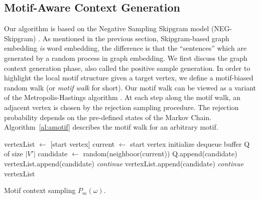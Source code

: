 \documentclass[letterpaper]{article}
\begin{document}
        \subsection{Motif-Aware Context Generation}

            Our algorithm is based on the Negative Sampling Skipgram model (NEG-Skipgram) \cite{skipgram}.
            As mentioned in the previous section, Skipgram-based graph embedding \emph{is} word embedding,
            the difference is that the ``sentences'' which are generated by a random process in graph embedding.
            We first discuss the graph context generation phase, also called the positive sample generation.
            In order to highlight the local motif structure given a target vertex, we define a motif-biased
            random walk (or \emph{motif walk} for short). Our motif walk can be viewed as a variant of
            the Metropolis-Hastings algorithm \cite{mh}. At each step along 
            the motif walk, an adjacent vertex is chosen by the rejection sampling procedure. The rejection
            probability depends on the pre-defined states of the Markov Chain. Algorithm~\ref{al:amotif} 
            describes the motif walk for an arbitrary motif.

            \begin{algorithm}
                \DontPrintSemicolon
                vertexList $\longleftarrow$ [start vertex] \;
                current $\longleftarrow$ start vertex \;
                initialize dequeue buffer Q of size $|V'|$ \;
                 {
                    candidate $\longleftarrow$ random(neighboor(current)) \;
                    Q.append(candidate) \;
                     {
                         {
                            vertexList.append(candidate) \;
                        } {
                            \emph{continue} \; 
                        }
                    } {
                         {
                            vertexList.append(candidate) \;
                        } {
                            \emph{continue} \;
                        }
                    }
                }
                \Return vertexList \;
                \caption{Motif context sampling $P_m(\omega)$.}
                \label{al:amotif}
            \end{algorithm}
\end{document}
